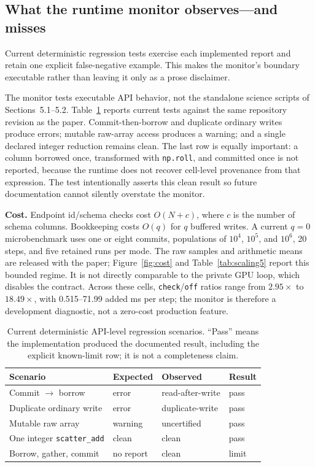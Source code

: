 \documentclass[sigconf,nonacm,review,natbib=true]{acmart}
\theoremstyle{definition}
\theoremstyle{plain}
\theoremstyle{remark}
\begin{document}
\subsection{What the runtime monitor observes---and misses}

Current deterministic regression tests exercise each implemented report and
retain one explicit false-negative example. This makes the monitor's boundary
executable rather than leaving it only as a prose disclaimer.

The monitor tests executable API behavior, not the standalone science scripts
of Sections~5.1--5.2. Table~\ref{tab:detection} reports current tests against the
same repository revision as the paper. Commit-then-borrow and duplicate
ordinary writes produce errors; mutable raw-array access
produces a warning; and a single declared integer reduction remains clean. The
last row is equally important: a column borrowed once, transformed with
\texttt{np.roll}, and committed once is not reported, because the runtime does
not recover cell-level provenance from that expression. The test intentionally
asserts this clean result so future documentation cannot silently overstate the
monitor.

\textbf{Cost.} Endpoint id/schema checks cost $O(N+c)$, where $c$ is the number
of schema columns. Bookkeeping costs $O(q)$ for $q$ buffered writes. A current
$q{=}0$ microbenchmark uses one or eight commits, populations of $10^4$,
$10^5$, and $10^6$, 20 steps, and five retained runs per mode. The raw
samples and arithmetic means are released with the paper; Figure~\ref{fig:cost}
and Table~\ref{tab:scaling5} report this bounded regime. It is not directly
comparable to the private GPU loop, which disables the contract. Across these
cells, \texttt{check}/\texttt{off} ratios range from $2.95\times$ to
$18.49\times$, with 0.515--71.99 added ms per step; the monitor is therefore a
development diagnostic, not a zero-cost production feature.

\begin{table}[t]
\centering\footnotesize
\caption{Current deterministic API-level regression scenarios. ``Pass'' means
the implementation produced the documented result, including the explicit
known-limit row; it is not a completeness claim.}
\label{tab:detection}
\begin{tabularx}{\columnwidth}{@{}>{\raggedright\arraybackslash}X l l l@{}}
\toprule
Scenario & Expected & Observed & Result \\
\midrule
Commit $\rightarrow$ borrow & error & read-after-write & pass \\
Duplicate ordinary write & error & duplicate-write & pass \\
Mutable raw array & warning & uncertified & pass \\
One integer \texttt{scatter\_add} & clean & clean & pass \\
Borrow, gather, commit & no report & clean & limit \\
\bottomrule
\end{tabularx}
\end{table}
\end{document}

